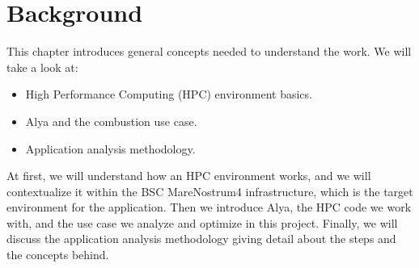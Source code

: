 \chapter{Background}

This chapter introduces general concepts needed to understand the work. We will take a look at:

\begin{itemize}
  \item High Performance Computing (HPC) environment basics.
  \item Alya and the combustion use case.
  \item Application analysis methodology.
\end{itemize}

At first, we will understand how an HPC environment works, and we will contextualize it within the BSC MareNostrum4 infrastructure, which is the target environment for the application. Then we introduce Alya, the HPC code we work with, and the use case we analyze and optimize in this project. Finally, we will discuss the application analysis methodology giving detail about the steps and the concepts behind.






